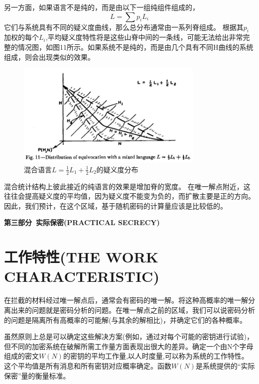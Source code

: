 \documentclass[]{article}
\begin{document}
另一方面，如果语言不是纯的，而是由以下一组纯组件组成的，
\[L=\sum {p_i L_i}\]
它们与系统具有不同的疑义度曲线，那么总分布通常由一系列脊组成。
根据其$p_i$加权的每个$L_i$,平均疑义度特性将是这些山脊中间的一条线，可能无法给出非常完整的情况图，如图11所示。如果系统不是纯的，而是由几个具有不同H曲线的系统组成，则会出现类似的效果。

\begin{figure}[htbp]
	\centering
	\includegraphics[width=0.8\textwidth]{fig11.png}
	\caption{混合语言$L=\frac{1}{2}L_1 + \frac{1}{2}L_2$的疑义度分布}
	\label{fig:fig11}
\end{figure}

混合统计结构上彼此接近的纯语言的效果是增加脊的宽度。
在唯一解点附近，这往往会提高疑义度的平均值，因为疑义度不能变为负的，而扩散主要是正的方向。因此，我们预计，在这个区域，基于随机密码的计算量应该是比较低的。

\newpage
%   
%

\begin{center}
	\LARGE{\textbf{第三部分\ 实际保密(PRACTICAL SECRECY)}}
\end{center}

\section{工作特性(THE WORK CHARACTERISTIC)}

在拦截的材料经过唯一解点后，通常会有密码的唯一解。将这种高概率的唯一解分离出来的问题就是密码分析的问题。在唯一解点之前的区域，我们可以说密码分析的问题是隔离所有高概率的可能解(与其余的解相比)，并确定它们的各种概率。

虽然原则上总是可以确定这些解决方案(例如，通过对每个可能的密钥进行试验)，但不同的加密系统在破解所需工作量方面表现出很大的差异。确定一个由N个字母组成的密文$W(N)$的密钥的平均工作量,以人时度量,可以称为系统的工作特性。
这个平均值是所有消息和所有密钥对应概率确定。函数$W(N)$是系统提供的“实际保密”量的衡量标准。
\end{document}
